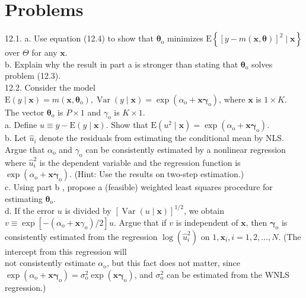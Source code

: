 \documentclass[10pt]{article}
\begin{document}
\section*{Problems}
12.1. a. Use equation (12.4) to show that $\boldsymbol{\theta}_{\mathrm{o}}$ minimizes $\mathrm{E}\left\{[y-m(\mathbf{x}, \boldsymbol{\theta})]^{2} \mid \mathbf{x}\right\}$ over $\Theta$ for any $\mathbf{x}$.\\
b. Explain why the result in part a is stronger than stating that $\boldsymbol{\theta}_{\mathrm{o}}$ solves problem (12.3).\\
12.2. Consider the model $\mathrm{E}(y \mid \mathbf{x})=m\left(\mathbf{x}, \boldsymbol{\theta}_{\mathrm{o}}\right), \operatorname{Var}(y \mid \mathbf{x})=\exp \left(\alpha_{\mathrm{o}}+\mathbf{x} \boldsymbol{\gamma}_{\mathrm{o}}\right)$, where $\mathbf{x}$ is $1 \times K$. The vector $\boldsymbol{\theta}_{\mathrm{o}}$ is $P \times 1$ and $\gamma_{\mathrm{o}}$ is $K \times 1$.\\
a. Define $u \equiv y-\mathrm{E}(y \mid \mathbf{x})$. Show that $\mathrm{E}\left(u^{2} \mid \mathbf{x}\right)=\exp \left(\alpha_{\mathrm{o}}+\mathbf{x} \boldsymbol{\gamma}_{\mathrm{o}}\right)$.\\
b. Let $\hat{u}_{i}$ denote the residuals from estimating the conditional mean by NLS. Argue that $\alpha_{\mathrm{o}}$ and $\gamma_{\mathrm{o}}$ can be consistently estimated by a nonlinear regression where $\hat{u}_{i}^{2}$ is the dependent variable and the regression function is $\exp \left(\alpha_{\mathrm{o}}+\mathbf{x} \boldsymbol{\gamma}_{\mathrm{o}}\right)$. (Hint: Use the results on two-step estimation.)\\
c. Using part b , propose a (feasible) weighted least squares procedure for estimating $\boldsymbol{\theta}_{\mathrm{o}}$.\\
d. If the error $u$ is divided by $[\operatorname{Var}(u \mid \mathbf{x})]^{1 / 2}$, we obtain $v \equiv \exp \left[-\left(\alpha_{\mathrm{o}}+\mathbf{x} \gamma_{\mathrm{o}}\right) / 2\right] u$. Argue that if $v$ is independent of $\mathbf{x}$, then $\boldsymbol{\gamma}_{\mathrm{o}}$ is consistently estimated from the regression $\log \left(\hat{u}_{i}^{2}\right)$ on $1, \mathbf{x}_{i}, i=1,2, \ldots, N$. (The intercept from this regression will\\
not consistently estimate $\alpha_{\mathrm{o}}$, but this fact does not matter, since $\exp \left(\alpha_{\mathrm{o}}+\mathbf{x} \boldsymbol{\gamma}_{\mathrm{o}}\right)= \sigma_{\mathrm{o}}^{2} \exp \left(\mathbf{x} \boldsymbol{\gamma}_{\mathrm{o}}\right)$, and $\sigma_{\mathrm{o}}^{2}$ can be estimated from the WNLS regression.)\\
\end{document}
